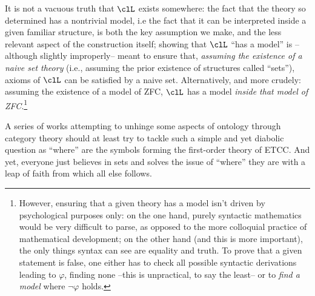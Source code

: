 It is not a vacuous truth that $\clL$ exists somewhere: the fact that the theory so determined has a nontrivial model, i.e the fact that it can be interpreted inside a given familiar structure, is both the key assumption we make, and the less relevant aspect of the construction itself; showing that $\clL$ ``has a model'' is --although slightly improperly-- meant to ensure that, \emph{assuming the existence of a naive set theory} (i.e., assuming the prior existence of structures called ``sets''), axioms of $\clL$ can be satisfied by a naive set. Alternatively, and more crudely: assuming the existence of a model of ZFC, $\clL$ has a model \emph{inside that model of ZFC}.\footnote{However, ensuring that a given theory has a model isn't driven by psychological purposes only: on the one hand, purely syntactic mathematics would be very difficult to parse, as opposed to the more colloquial practice of mathematical development; on the other hand (and this is more important), the only things syntax can see are equality and truth. To prove that a given statement is false, one either has to check all possible syntactic derivations leading to $\varphi$, finding none --this is unpractical, to say the least-- or to \emph{find a model} where $\lnot\varphi$ holds.}

A series of works attempting to unhinge some aspects of ontology through category theory should at least try to tackle such a simple and yet diabolic question as ``where'' are the symbols forming the first-order theory of ETCC. And yet, everyone just believes in sets and solves the issue of ``where'' they are with a leap of faith from which all else follows.

